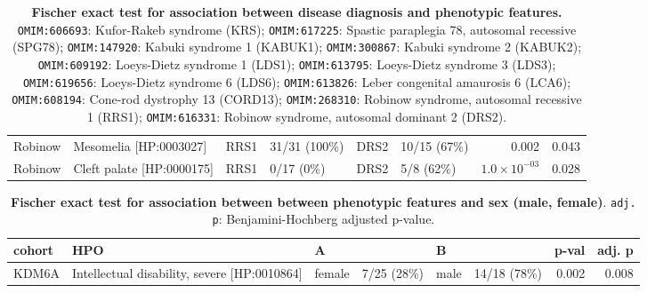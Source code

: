 \begin{table}
\begin{scriptsize}
\begin{tabular}{l>{\raggedright}p{2.5cm}llllrr}
Robinow & Mesomelia [HP:0003027] & RRS1 & 31/31 (100\%) & DRS2 & 10/15 (67\%) & 0.002 & 0.043\\
Robinow & Cleft palate [HP:0000175] & RRS1 & 0/17 (0\%) & DRS2 & 5/8 (62\%) & $1.0 \times 10^{-03}$ & 0.028\\
\bottomrule
\end{tabular}
\end{scriptsize}
\caption{\textbf{Fischer exact test for association between disease diagnosis and phenotypic features.}
\texttt{OMIM:606693}: Kufor-Rakeb syndrome (KRS);
 \texttt{OMIM:617225}: Spastic paraplegia 78, autosomal recessive (SPG78);
 \texttt{OMIM:147920}: Kabuki syndrome 1 (KABUK1);
 \texttt{OMIM:300867}: Kabuki syndrome 2 (KABUK2);
 \texttt{OMIM:609192}: Loeys-Dietz syndrome 1 (LDS1);
 \texttt{OMIM:613795}:  Loeys-Dietz syndrome 3 (LDS3);
 \texttt{OMIM:619656}: Loeys-Dietz syndrome 6 (LDS6);
 \texttt{OMIM:613826}: Leber congenital amaurosis 6 (LCA6);
 \texttt{OMIM:608194}:  Cone-rod dystrophy 13 (CORD13);
 \texttt{OMIM:268310}: Robinow syndrome, autosomal recessive 1 (RRS1);
 \texttt{OMIM:616331}: Robinow syndrome, autosomal dominant 2 (DRS2).
}
\label{tab:disease_dx}
\end{table}



\clearpage
\newpage

\begin{table}
\centering
\begin{tabular}{l>{\raggedright}p{4cm}lp{2cm}lp{2.4cm}rr}
\toprule
\textbf{cohort} & \textbf{HPO} & \textbf{A} & \textbf{} & \textbf{B} & \textbf{} & \textbf{p-val} & \textbf{adj. p}\\
\midrule
KDM6A & Intellectual disability, severe [HP:0010864] & female & 7/25 (28\%) & male & 14/18 (78\%) & 0.002 & 0.008\\
\bottomrule
\end{tabular}
\caption{\textbf{Fischer exact test for association between  between phenotypic features and sex (male, female)}. \texttt{adj. p}: Benjamini-Hochberg adjusted p-value.}
\label{tab:mf_hpo}
\end{table}
\clearpage
\newpage

